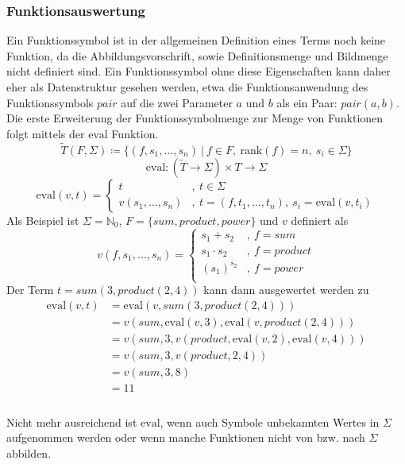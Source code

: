 \documentclass{article}
\begin{document}
\subsubsection{Funktionsauswertung}
Ein Funktionssymbol ist in der allgemeinen Definition eines Terms noch keine Funktion, da die Abbildungsvorschrift, sowie Definitionsmenge und Bildmenge nicht definiert sind. Ein Funktionssymbol ohne diese Eigenschaften kann daher eher als Datenstruktur gesehen werden, etwa die Funktionsanwendung des Funktionssymbols $pair$ auf die zwei Parameter $a$ und $b$ als ein Paar: $pair(a, b)$.\\
Die erste Erweiterung der Funktionssymbolmenge zur Menge von Funktionen folgt mittels der $\mathrm{eval}$ Funktion.
$$\tilde{T}(F, \Sigma) \coloneqq \{(f, s_1, \dots, s_n)~|~f \in F,~\mathrm{rank}(f) = n,~s_i \in \Sigma\}$$
$$\mathrm{eval} \colon (\tilde{T} \rightarrow \Sigma) \times T \rightarrow \Sigma$$
$$\mathrm{eval}(v, t) = \begin{cases} 
            t &,~ t\in \Sigma \\
            v(s_1, \dots, s_n) &,~ t = (f, t_1, \dots , t_n), ~s_i = \mathrm{eval}(v, t_i)
            \end{cases}$$
Als Beispiel ist $\Sigma = \mathbb{N}_0$, $F = \{sum, product, power\}$ und $v$ definiert als
$$v(f, s_1, \dots, s_n) = \begin{cases}
s_1 + s_2 &,~ f = sum\\
s_1 \cdot s_2 &,~ f = product\\
(s_1)^{s_2} &,~ f = power\\
\end{cases}$$
Der Term $t = sum(3, product(2, 4))$ kann dann ausgewertet werden zu 
\begin{equation}
    \begin{split}
    \mathrm{eval}(v, t) &= \mathrm{eval}(v, sum(3, product(2, 4))) \\
    &= v(sum, \mathrm{eval}(v, 3), \mathrm{eval}(v, product(2, 4))) \\
    &= v(sum, 3, v(product, \mathrm{eval}(v, 2), \mathrm{eval}(v, 4))) \\
    &= v(sum, 3, v(product, 2, 4)) \\
    &= v(sum, 3, 8) \\
    &= 11 \\
    \end{split}
\end{equation}
\\
Nicht mehr ausreichend ist $\mathrm{eval}$, wenn auch Symbole unbekannten Wertes in $\Sigma$ aufgenommen werden oder wenn manche Funktionen nicht von bzw. nach $\Sigma$ abbilden. 
\end{document}
